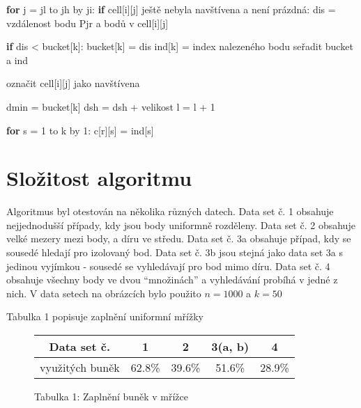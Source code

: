 \documentclass[
12pt,
a4paper,
pdftex,
czech,
titlepage
]{report}
\newenvironment{Shaded}{}{}
\newcommand{\ControlFlowTok}[1]{\textcolor[rgb]{0.00,0.44,0.13}{\textbf{#1}}}
\newcommand{\DecValTok}[1]{\textcolor[rgb]{0.25,0.63,0.44}{#1}}
\newcommand{\NormalTok}[1]{#1}
\newcommand{\OperatorTok}[1]{\textcolor[rgb]{0.40,0.40,0.40}{#1}}
\begin{document}
\begin{Shaded}
\begin{Highlighting}[]
      \ControlFlowTok{for}\NormalTok{ j }\OperatorTok{=}\NormalTok{ jl to jh by ji:}
        \ControlFlowTok{if}\NormalTok{ cell[i][j] ještě nebyla navštívena a není prázdná:         }
\NormalTok{          dis }\OperatorTok{=}\NormalTok{ vzdálenost bodu Pjr a bodů v cell[i][j]}
            
          \ControlFlowTok{if}\NormalTok{ dis }\OperatorTok{\textless{}}\NormalTok{ bucket[k]:}
\NormalTok{            bucket[k] }\OperatorTok{=}\NormalTok{ dis}
\NormalTok{            ind[k] }\OperatorTok{=}\NormalTok{ index nalezeného bodu}
\NormalTok{            seřadit bucket a ind}
              
\NormalTok{          označit cell[i][j] jako navštívena}
            
  \NormalTok{  dmin }\OperatorTok{=}\NormalTok{ bucket[k]}
  \NormalTok{  dsh }\OperatorTok{=}\NormalTok{ dsh }\OperatorTok{+}\NormalTok{ velikost}
  \NormalTok{  l }\OperatorTok{=}\NormalTok{ l }\OperatorTok{+} \DecValTok{1}
        
  \ControlFlowTok{for}\NormalTok{ s }\OperatorTok{=} \DecValTok{1}\NormalTok{ to k by }\DecValTok{1}\NormalTok{:}
\NormalTok{    c[r][s] }\OperatorTok{=}\NormalTok{ ind[s]}
\end{Highlighting}
\end{Shaded}

\hypertarget{sloux17eitost-algoritmu}{%
\chapter{Složitost algoritmu}\label{sloux17eitost-algoritmu}}

Algoritmus byl otestován na několika různých datech. Data set č. 1
obsahuje nejjednodušší případy, kdy jsou body uniformně rozděleny. Data
set č. 2 obsahuje velké mezery mezi body, a díru ve středu. Data set č.
3a obsahuje případ, kdy se sousedé hledají pro izolovaný bod. Data set
č. 3b jsou stejná jako data set 3a s jedinou vyjímkou - sousedé se
vyhledávají pro bod mimo díru. Data set č. 4 obsahuje všechny body ve
dvou ``množinách'' a vyhledávání probíhá v jedné z nich. V data setech
na obrázcích bylo použito \(n = 1000\) a \(k = 50\)

Tabulka 1 popisuje zaplnění uniformní mřížky

\begin{figure}[htp]
\centering
\begin{longtable}[]{@{}ccccc@{}}
\toprule
Data set č. & 1 & 2 & 3(a, b) & 4 \\
\midrule
\endhead
využitých buněk & 62.8\% & 39.6\% & 51.6\% & 28.9\% \\
\bottomrule
\end{longtable}
\captionsetup{labelformat=empty}
\caption{Tabulka 1: Zaplnění buněk v mřížce \cite{base}}
\end{figure}
\end{document}
